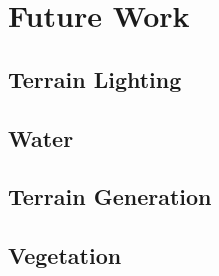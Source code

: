 
\chapter{Future Work}

\section{Terrain Lighting}


\section{Water}



\section{Terrain Generation}



\section{Vegetation}


